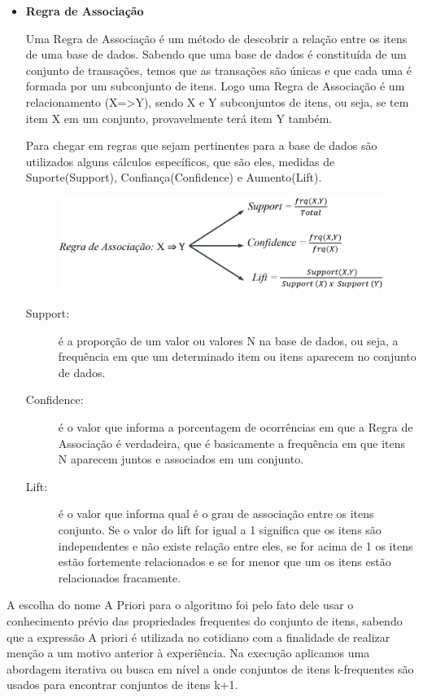 \documentclass[tcc1]{uftex}
\begin{document}
\begin{itemize}
 \setlength{\parindent}{1.25cm}
 \item\textbf{Regra de Associação}
  
  Uma Regra de Associação é um método de descobrir a relação entre os itens de uma base de dados. Sabendo que uma base de dados é constituída de um conjunto de transações, temos que as transações são únicas e que cada uma é formada por um subconjunto de itens. Logo uma Regra de Associação é um relacionamento (X=>Y), sendo X e Y subconjuntos de itens, ou seja, se tem item X em um conjunto, provavelmente terá item Y também.\cite{agrawal1993mining}
  
  Para chegar em regras que sejam pertinentes para a base de dados são utilizados alguns cálculos específicos, que são eles, medidas de  Suporte(Support), Confiança(Confidence) e Aumento(Lift).
    \begin{figure}[!h]
    \centering
    \includegraphics[width=12cm]{formula_000.jpeg}
    \end{figure}
    \begin{description}
    \item[Support:] é a proporção de um valor ou valores N na base de dados, ou seja, a frequência em que um determinado item ou itens aparecem no conjunto de dados. 
    \item[Confidence:] é o valor que informa a porcentagem de ocorrências em que a Regra de Associação é verdadeira, que é basicamente a frequência em que itens N aparecem juntos e associados em um conjunto. 
    \item[Lift:] é o valor que informa qual é o grau de associação entre os itens conjunto. Se o valor do lift for igual a 1 significa que os itens são independentes e não existe relação entre eles, se for acima de 1 os itens estão fortemente relacionados e se for menor que um os itens estão relacionados fracamente. 
    \end{description}

 \end{itemize}

A escolha do nome  A Priori para o algoritmo foi pelo fato dele usar o conhecimento prévio das propriedades frequentes do conjunto de itens, sabendo que a expressão A priori é utilizada no cotidiano com a finalidade de realizar menção a um motivo anterior à experiência. Na execução aplicamos uma abordagem iterativa ou busca em nível a onde conjuntos de itens k-frequentes são usados para encontrar conjuntos de itens k+1. 
\end{document}
